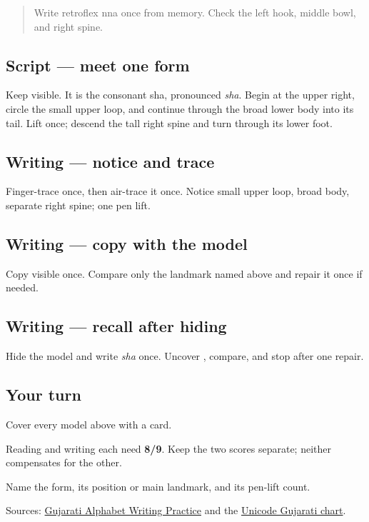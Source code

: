 \label{lesson:GU-W03-sha}



\begin{quote}
Write retroflex nna once from memory. Check the left hook, middle bowl, and right spine.
\end{quote}

\subsection*{Script — meet one form}
Keep \textbf{} visible. It is the consonant sha, pronounced \emph{sha}. Begin at the upper right, circle the small upper loop, and continue through the broad lower body into its tail. Lift once; descend the tall right spine and turn through its lower foot.

\subsection*{Writing — notice and trace}

Finger-trace \textbf{} once, then air-trace it once. Notice small upper loop, broad body, separate right spine; one pen lift.

\subsection*{Writing — copy with the model}
Copy visible \textbf{} once. Compare only the landmark named above and repair it once if needed.

\subsection*{Writing — recall after hiding}
Hide the model and write \emph{sha} once. Uncover \textbf{}, compare, and stop after one repair.

\subsection*{Your turn}
Cover every model above with a card.

Reading and writing each need \textbf{8/9}. Keep the two scores separate; neither compensates for the other.

\begin{tcolorbox}[breakable,colback=teal!4,colframe=teal!35!black,title={Before you move on}]
Name the form, its position or main landmark, and its pen-lift count.

Sources: \href{https://www.t30apps.com/gujarati-alphabet-writing/}{Gujarati Alphabet Writing Practice} and the \href{https://www.unicode.org/charts/PDF/U0A80.pdf}{Unicode Gujarati chart}.
\end{tcolorbox}
